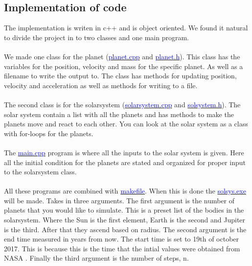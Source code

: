 \subsection{Implementation of code}

The implementation is writen in c++ and is object oriented. We found it natural to divide the project in to two classes and one main program. 
\\
\\
We made one class for the planet (\href{https://github.com/erikfsk/Project-3/blob/master/Project3/planet.cpp}{\textcolor{blue}{planet.cpp}} and \href{https://github.com/erikfsk/Project-3/blob/master/Project3/planet.h}{\textcolor{blue}{planet.h}}). This class has the variables for the position, velocity and mass for the specific planet. As well as a filename to write the output to. The class has methods for updating position, velocity and acceleration as well as methods for writing to a file. 
\\
\\
The second class is for the solarsystem (\href{https://github.com/erikfsk/Project-3/blob/master/Project3/solarsystem.cpp}{\textcolor{blue}{solarsystem.cpp}} and \href{https://github.com/erikfsk/Project-3/blob/master/Project3/solarsystem.h}{\textcolor{blue}{solsystem.h}}). The solar system contain a list with all the planets and has methods to make the planets move and react to each other. You can look at the solar system as a class with for-loops for the planets. 
\\
\\
The \href{https://github.com/erikfsk/Project-3/blob/master/Project3/main.cpp}{\textcolor{blue}{main.cpp}} program is where all the inputs to the solar system is given. Here all the initial condition for the planets are stated and organized for proper input to the solarsystem class. 
\\
\\
All these programs are combined with \href{https://github.com/erikfsk/Project-3/blob/master/Project3/makefile}{\textcolor{blue}{makefile}}. When this is done the \href{https://github.com/erikfsk/Project-3/blob/master/Project3/solsys.exe}{\textcolor{blue}{solsys.exe}} will be made. Takes in three arguments. The first argument is the number of planets that you would like to simulate. This is a preset list of the bodies in the solarsystem. Where the Sun is the first element, Earth is the second and Jupiter is the third. After that they ascend based on radius. The second argument is the end time measured in years from now. The start time is set to 19th of october 2017. This is because this is the time that the intial values were obtained from NASA . Finally the third argument is the number of steps, n. 
